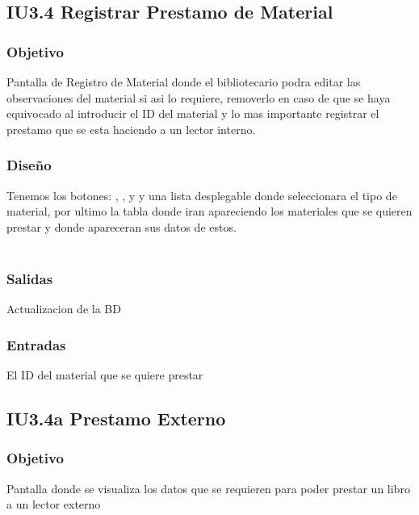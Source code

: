 \newpage
\subsection{IU3.4 Registrar Prestamo de Material}

\subsubsection{Objetivo}
	Pantalla de Registro de Material donde el bibliotecario podra editar las observaciones del material si asi lo requiere, removerlo en caso de que se haya equivocado al introducir el ID del material y lo mas importante registrar el prestamo que se esta haciendo a un lector interno.  

\subsubsection{Diseño}
	Tenemos los botones: , ,  y  y una lista desplegable donde seleccionara el tipo de material, por ultimo la tabla donde iran apareciendo los materiales que se quieren prestar y donde apareceran sus datos de estos.  \\\\


\subsubsection{Salidas}
	\begin{Citemize}
		\item Actualizacion de la BD 
	\end{Citemize}
	
\subsubsection{Entradas}
	\begin{Citemize}
		\item El ID del material que se quiere prestar
	\end{Citemize}

\newpage
\subsection{IU3.4a Prestamo Externo}

\subsubsection{Objetivo}
	Pantalla donde se visualiza los datos que se requieren para poder prestar un libro a un lector externo 

